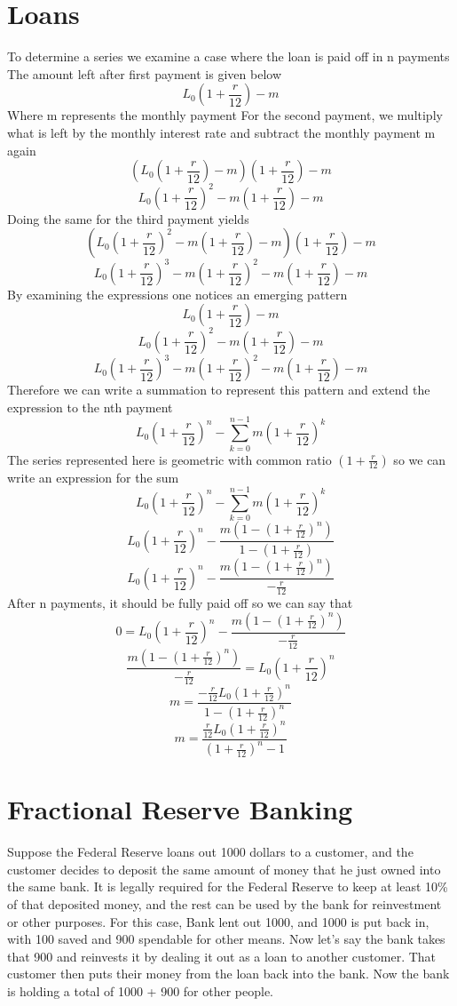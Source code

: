 \documentclass{article}
\begin{document}
\section*{Loans}
To determine a series we examine a case where the loan is paid off in n payments\newline
The amount left after first payment is given below
$$L_0(1+\frac{r}{12})-m$$
Where m represents the monthly payment\newline
For the second payment, we multiply what is left by the monthly interest rate and subtract the monthly payment m again
$$(L_0(1+\frac{r}{12})-m)(1+\frac{r}{12})-m $$
$$L_0(1+\frac{r}{12})^2-m(1+\frac{r}{12})-m $$
Doing the same for the third payment yields
$$(L_0(1+\frac{r}{12})^2-m(1+\frac{r}{12})-m)(1+\frac{r}{12})-m $$
$$L_0(1+\frac{r}{12})^3-m(1+\frac{r}{12})^2-m(1+\frac{r}{12})-m $$
By examining the expressions one notices an emerging pattern
$$L_0(1+\frac{r}{12})-m$$
$$L_0(1+\frac{r}{12})^2-m(1+\frac{r}{12})-m $$
$$L_0(1+\frac{r}{12})^3-m(1+\frac{r}{12})^2-m(1+\frac{r}{12})-m $$
Therefore we can write a summation to represent this pattern and extend the expression to the nth payment
$$L_0(1+\frac{r}{12})^n- \sum_{k=0}^{n-1} m(1+\frac{r}{12})^k $$
The series represented here is geometric with common ratio $(1+\frac{r}{12})$ so we can write an expression for the sum
$$L_0(1+\frac{r}{12})^n- \sum_{k=0}^{n-1} m(1+\frac{r}{12})^k $$
$$L_0(1+\frac{r}{12})^n- \frac{m(1-(1+\frac{r}{12})^{n})}{1-(1+\frac{r}{12})}$$
$$L_0(1+\frac{r}{12})^n- \frac{m(1-(1+\frac{r}{12})^{n})}{-\frac{r}{12}}$$
After n payments, it should be fully paid off so we can say that
$$0=L_0(1+\frac{r}{12})^n- \frac{m(1-(1+\frac{r}{12})^{n})}{-\frac{r}{12}}$$
$$\frac{m(1-(1+\frac{r}{12})^{n})}{-\frac{r}{12}}=L_0(1+\frac{r}{12})^n$$
$$m=\frac{-\frac{r}{12}L_0(1+\frac{r}{12})^n}{{1-(1+\frac{r}{12})^{n}}}$$
$$m=\frac{\frac{r}{12}L_0(1+\frac{r}{12})^n}{{(1+\frac{r}{12})^{n}-1}}$$

\section*{Fractional Reserve Banking}
Suppose the Federal Reserve loans out 1000 dollars to a customer, and the customer decides to deposit the same amount of money that he just owned into the same bank. It is legally required for the Federal Reserve to keep at least 10\% of that deposited money, and the rest can be used by the bank for reinvestment or other purposes.\newline
For this case, \newline
Bank lent out 1000, and 1000 is put back in, with 100 saved and 900 spendable for other means.\newline
Now let's say the bank takes that 900 and reinvests it by dealing it out as a loan to another customer. That customer then puts their money from the loan back into the bank.\newline
Now the bank is holding a total of 1000 + 900 for other people. 
\end{document}
